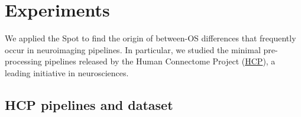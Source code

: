 \documentclass[a4paper,num-refs]{oup-contemporary}
\newcommand{\toolname}[0]{Spot\xspace}
\begin{document}
\section{Experiments}

We applied the \toolname to find the origin of between-OS differences that
frequently occur in neuroimaging pipelines. In particular, we studied the minimal
pre-processing pipelines released by the Human Connectome Project
(\href{https://www.humanconnectome.org}{HCP}), a leading initiative in
neurosciences. 




\subsection{HCP pipelines and dataset}

\end{document}
